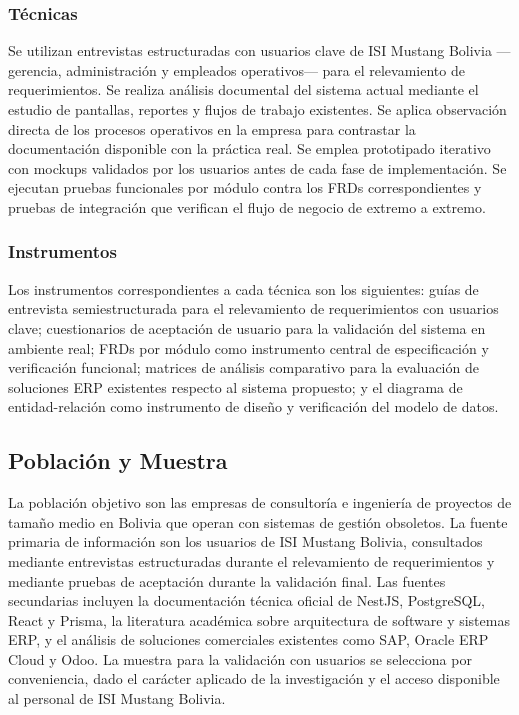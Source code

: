 \documentclass{univalle-perfil}
\begin{document}
\subsubsection{Técnicas}

Se utilizan entrevistas estructuradas con usuarios clave de ISI Mustang Bolivia —gerencia, administración y empleados operativos— para el relevamiento de requerimientos. Se realiza análisis documental del sistema actual mediante el estudio de pantallas, reportes y flujos de trabajo existentes. Se aplica observación directa de los procesos operativos en la empresa para contrastar la documentación disponible con la práctica real. Se emplea prototipado iterativo con mockups validados por los usuarios antes de cada fase de implementación. Se ejecutan pruebas funcionales por módulo contra los FRDs correspondientes y pruebas de integración que verifican el flujo de negocio de extremo a extremo.

\subsubsection{Instrumentos}

Los instrumentos correspondientes a cada técnica son los siguientes: guías de entrevista semiestructurada para el relevamiento de requerimientos con usuarios clave; cuestionarios de aceptación de usuario para la validación del sistema en ambiente real; FRDs por módulo como instrumento central de especificación y verificación funcional; matrices de análisis comparativo para la evaluación de soluciones ERP existentes respecto al sistema propuesto; y el diagrama de entidad-relación como instrumento de diseño y verificación del modelo de datos.

\subsection{Población y Muestra}

La población objetivo son las empresas de consultoría e ingeniería de proyectos de tamaño medio en Bolivia que operan con sistemas de gestión obsoletos. La fuente primaria de información son los usuarios de ISI Mustang Bolivia, consultados mediante entrevistas estructuradas durante el relevamiento de requerimientos y mediante pruebas de aceptación durante la validación final. Las fuentes secundarias incluyen la documentación técnica oficial de NestJS, PostgreSQL, React y Prisma, la literatura académica sobre arquitectura de software y sistemas ERP, y el análisis de soluciones comerciales existentes como SAP, Oracle ERP Cloud y Odoo. La muestra para la validación con usuarios se selecciona por conveniencia, dado el carácter aplicado de la investigación y el acceso disponible al personal de ISI Mustang Bolivia.
\end{document}
